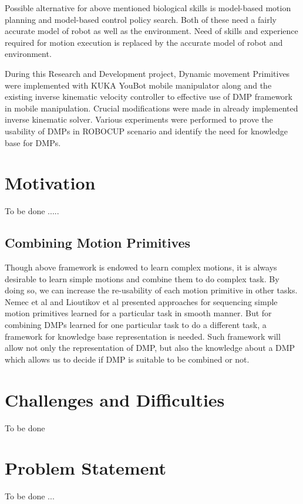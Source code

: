 \par Possible alternative for above mentioned biological skills is model-based motion planning and model-based control policy search. Both of these need a fairly accurate model of robot as well as the environment. Need of skills and experience required for motion execution is replaced by the accurate model of robot and environment. 

\par During this Research and Development project, Dynamic movement Primitives were implemented with KUKA YouBot mobile manipulator along and the existing inverse kinematic velocity controller to effective use of DMP framework in mobile manipulation. Crucial modifications were made in already implemented inverse kinematic solver. Various experiments were performed to prove the usability of DMPs in ROBOCUP scenario and identify the need for knowledge base for DMPs. 

\section{Motivation}
\par  

To be done ..... 

\subsection{Combining Motion Primitives}
\par Though above framework is endowed to learn complex motions, it is always desirable to learn simple motions and combine them to do complex task. By doing so, we can increase the re-usability of each motion primitive in other tasks. Nemec et al %
and Lioutikov et al %
presented approaches for sequencing simple motion primitives learned for a particular task in smooth manner. But for combining DMPs learned for one particular task to do a different task, a framework for knowledge base representation is needed. Such framework will allow not only the representation of DMP, but also the knowledge about a DMP which allows us to decide if DMP is suitable to be combined or not.   






\section{Challenges and Difficulties}

To be done


\section{Problem Statement}

To be done ... 